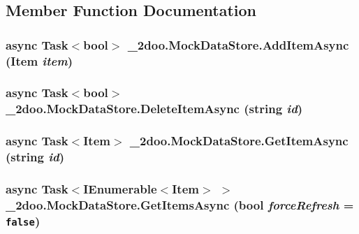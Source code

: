 \subsection{Member Function Documentation}
\hypertarget{class__2doo_1_1_mock_data_store_a777866456d60063ae902ce9448e3e07}{
\subsubsection[{AddItemAsync}]{\setlength{\rightskip}{0pt plus 5cm}async Task$<$bool$>$ \_\-2doo.MockDataStore.AddItemAsync ({\bf Item} {\em item})}}
\label{class__2doo_1_1_mock_data_store_a777866456d60063ae902ce9448e3e07}


\hypertarget{class__2doo_1_1_mock_data_store_80554e16cb5cfa633774a346386ad668}{
\subsubsection[{DeleteItemAsync}]{\setlength{\rightskip}{0pt plus 5cm}async Task$<$bool$>$ \_\-2doo.MockDataStore.DeleteItemAsync (string {\em id})}}
\label{class__2doo_1_1_mock_data_store_80554e16cb5cfa633774a346386ad668}


\hypertarget{class__2doo_1_1_mock_data_store_37eef90284f96691312eaecdb207bbbf}{
\subsubsection[{GetItemAsync}]{\setlength{\rightskip}{0pt plus 5cm}async Task$<${\bf Item}$>$ \_\-2doo.MockDataStore.GetItemAsync (string {\em id})}}
\label{class__2doo_1_1_mock_data_store_37eef90284f96691312eaecdb207bbbf}


\hypertarget{class__2doo_1_1_mock_data_store_bfa3afa8cb431cda5a840bc603838d79}{
\subsubsection[{GetItemsAsync}]{\setlength{\rightskip}{0pt plus 5cm}async Task$<$IEnumerable$<${\bf Item}$>$ $>$ \_\-2doo.MockDataStore.GetItemsAsync (bool {\em forceRefresh} = {\tt false})}}
\label{class__2doo_1_1_mock_data_store_bfa3afa8cb431cda5a840bc603838d79}


